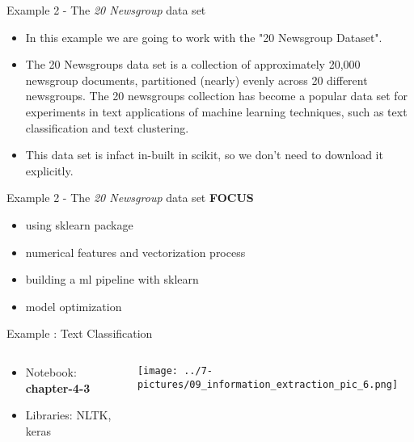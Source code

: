 \documentclass[11pt]{beamer}
\begin{document}
\begin{frame}{Example 2 - The \textit{20 Newsgroup} data set}
	\begin{itemize}
		\item In this example we are going to work with the "20 Newsgroup Dataset". 
		\item The 20 Newsgroups data set is a collection of approximately 20,000 newsgroup documents, partitioned (nearly) evenly across 20 different newsgroups. The 20 newsgroups collection has become a popular data set for experiments in text applications of machine learning techniques, such as text classification and text clustering. 
		\item This data set is infact in-built in scikit, so we don’t need to download it explicitly.
	\end{itemize}
\end{frame}
\begin{frame}{Example 2 - The \textit{20 Newsgroup} data set}
	\textbf{FOCUS}
	\vspace{0.5cm}
	\begin{itemize}
		\item using sklearn package
		\item numerical features and vectorization process
		\item building a ml pipeline with sklearn
		\item model optimization
	\end{itemize}
\end{frame}
\begin{frame}{Example : Text Classification}
\begin{columns}[T] %
\begin{column}{.48\textwidth}
        \begin{itemize}
		\item Notebook: \textbf{chapter-4-3}
		\item Libraries: NLTK, keras
        \end{itemize}
\end{column}%
\hfill%
\begin{column}{.48\textwidth}
        \texttt{[image: ../7-pictures/09\_information\_extraction\_pic\_6.png]}
\end{column}%
\end{columns}
\end{frame}
\end{document}
